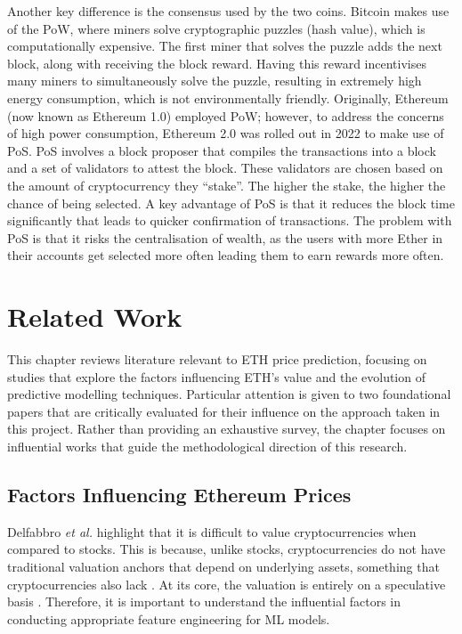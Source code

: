 \documentclass[ %
                    author={Raj Dhakan},
                supervisor={Dr. Ayush Joshi},
                    degree={MSc},
                     title={Ethereum Price Prediction using Internal and External Factors},
                  subtitle={},
                      type={},
                      year={2025}]{dissertation}
\begin{document}
Another key difference is the consensus used by the two coins. Bitcoin makes use of the PoW, where miners solve cryptographic puzzles (hash value), which is computationally expensive. The first miner that solves the puzzle adds the next block, along with receiving the block reward. Having this reward incentivises many miners to simultaneously solve the puzzle, resulting in extremely high energy consumption, which is not environmentally friendly. Originally, Ethereum (now known as Ethereum 1.0) employed PoW; however, to address the concerns of high power consumption, Ethereum 2.0 was rolled out in 2022 to make use of PoS. PoS involves a block proposer that compiles the transactions into a block and a set of validators to attest the block. These validators are chosen based on the amount of cryptocurrency they “stake”. The higher the stake, the higher the chance of being selected. A key advantage of PoS is that it reduces the block time significantly that leads to quicker confirmation of transactions. The problem with PoS is that it risks the centralisation of wealth, as the users with more Ether in their accounts get selected more often leading them to earn rewards more often.\cite{RN138}




\chapter{Related Work}
\label{chap:related_work}

This chapter reviews literature relevant to ETH price prediction, focusing on studies that explore the factors influencing ETH's value and the evolution of predictive modelling techniques. Particular attention is given to two foundational papers that are critically evaluated for their influence on the approach taken in this project. Rather than providing an exhaustive survey, the chapter focuses on influential works that guide the methodological direction of this research.


\section{Factors Influencing Ethereum Prices}
Delfabbro \textit{et al.} \cite{delfabbro2021psychology} highlight that it is difficult to value cryptocurrencies when compared to stocks. This is because, unlike stocks, cryptocurrencies do not have traditional valuation anchors that depend on underlying assets, something that cryptocurrencies also lack \cite{bhatnagar2023demystifying}. At its core, the valuation is entirely on a speculative basis \cite{bhatnagar2023demystifying}. Therefore, it is important to understand the influential factors in conducting appropriate feature engineering for ML models.
\end{document}
